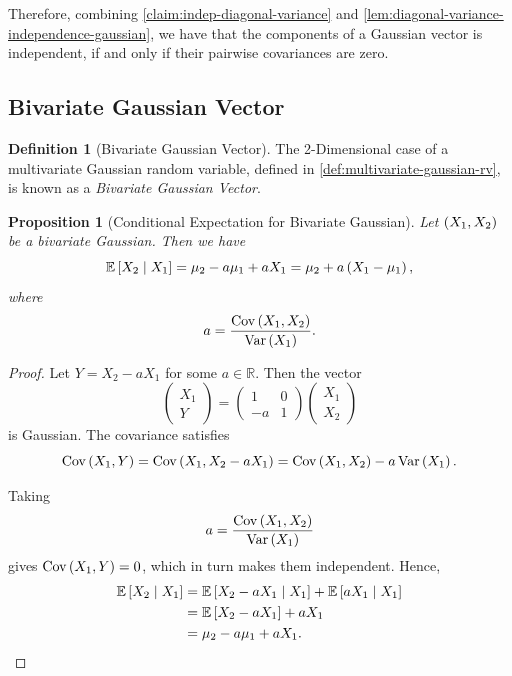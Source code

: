 \documentclass{article}
\newtheorem{proposition}[theorem]{Proposition}
\theoremstyle{definition}
\newtheorem{definition}[theorem]{Definition}
\theoremstyle{remark}
\newcommand{\RR}{\mathbb{R}}
\newcommand{\Expt}{\mathbb{E}}
\newcommand{\Conditional}[2]{#1\mid #2}
\newcommand{\pmqty}[1]{\begin{pmatrix}#1\end{pmatrix}}
\newcommand{\Var}{\operatorname{Var}}
\newcommand{\Cov}{\operatorname{Cov}}
\begin{document}
Therefore, combining \autoref{claim:indep-diagonal-variance} and \autoref{lem:diagonal-variance-independence-gaussian}, we have that the components of a Gaussian vector is independent, if and only if their pairwise covariances are zero.

\subsection{Bivariate Gaussian Vector}

\begin{definition}[Bivariate Gaussian Vector]
    \label{def:bivariate-gaussian-vector}%
    The 2-Dimensional case of a multivariate Gaussian random variable, defined in \autoref{def:multivariate-gaussian-rv}, is known as a \emph{Bivariate Gaussian Vector}.
\end{definition}

\begin{proposition}[Conditional Expectation for Bivariate Gaussian]
    Let \(\left(X_1, X_2\right)\) be a bivariate Gaussian. Then we have
    \[
        \Expt\bqty{\Conditional{X_2}{X_1}} = \mu_2 - a \mu_1 + a X_1 = \mu_2 + a \pqty{X_1 - \mu_1},
    \]
    where
    \[
        a = \frac{\Cov\pqty{X_1, X_2}}{\Var\pqty{X_1}}.
    \]
\end{proposition}


\begin{proof}
    Let \(Y = X_2 - a X_1\) for some \(a \in \RR\). Then the vector
    \[
        \pmqty{X_1 \\ Y}
        =
        \pmqty{
            1 & 0 \\
            -a & 1
        }
        \pmqty{X_1 \\ X_2}
    \]
    is Gaussian. The covariance satisfies
    \[
        \Cov\pqty{X_1, Y} = \Cov\pqty{X_1, X_2 - a X_1} = \Cov\pqty{X_1, X_2} - a \Var\pqty{X_1}.
    \]
    
    Taking
    \[
        a = \frac{\Cov\pqty{X_1, X_2}}{\Var\pqty{X_1}}
    \]
    gives \(\Cov\pqty{X_1, Y} = 0\), which in turn makes them independent. Hence,
    \begin{align*}
        \Expt\bqty{\Conditional{X_2}{X_1}} &= \Expt\bqty{\Conditional{X_2 - a X_1}{X_1}} + \Expt\bqty{\Conditional{a X_1}{X_1}} \\
        &= \Expt\bqty{X_2 - a X_1} + a X_1 \\
        &= \mu_2 - a \mu_1 + a X_1.
    \end{align*}
\end{proof}
\end{document}
